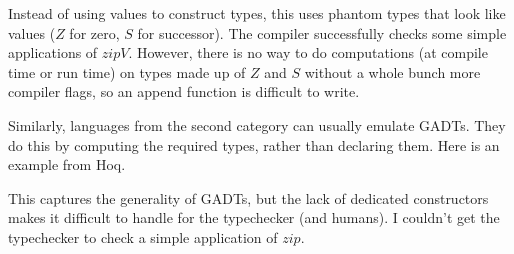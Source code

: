 \documentclass{article}
\begin{document}
\begin{enumerate}
    
    Instead of using values to construct types, this uses phantom types that look like values ($\mathit Z$ for zero, $\mathit S$ for successor). The compiler successfully checks some simple applications of $\mathit{zipV}$. However, there is no way to do computations (at compile time or run time) on types made up of $\mathit Z$ and $\mathit S$ without a whole bunch more compiler flags, so an append function is difficult to write.

    Similarly, languages from the second category can usually emulate GADTs. They do this by computing the required types, rather than declaring them. Here is an example from Hoq.
    
    This captures the generality of GADTs, but the lack of dedicated constructors makes it difficult to handle for the typechecker (and humans). I couldn't get the typechecker to check a simple application of $\mathit{zip}$.
\end{enumerate}
\end{document}
